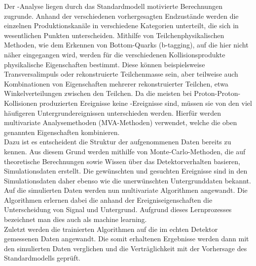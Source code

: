 Der \ttH-Analyse liegen durch das Standardmodell motivierte Berechnungen zugrunde. Anhand der verschiedenen vorhergesagten Endzust\"ande werden die einzelnen Produktionskan\"ale in verschiedene Kategorien unterteilt, die sich in wesentlichen Punkten unterscheiden. Mithilfe von Teilchenphysikalischen Methoden, wie dem Erkennen von Bottom-Quarks (b-tagging), auf die hier nicht n\"aher eingegangen wird, werden f\"ur die verschiedenen Kollisionsprodukte physikalische Eigenschaften bestimmt. Diese k\"onnen beispielsweise Transversalimpuls oder rekonstruierte Teilchenmasse sein, aber teilweise auch Kombinationen von Eigenschaften mehrerer rekonstruierter Teilchen, etwa Winkelverteilungen zwischen den Teilchen. Da die meisten bei Proton-Proton-Kollisionen produzierten Ereignisse keine \ttH-Ereignisse sind, m\"ussen sie von den viel h\"aufigeren Untergrundereignissen unterschieden werden. Hierf\"ur werden multivariate Analysemethoden (MVA-Methoden) verwendet, welche die oben genannten Eigenschaften kombinieren.\\
Dazu ist es entscheident die Struktur der aufgenommenen Daten bereits zu kennen. Aus diesem Grund werden mithilfe von Monte-Carlo-Methoden, die auf theoretische Berechnungen sowie Wissen \"uber das Detektorverhalten basieren, Simulationsdaten erstellt. Die gew\"unschten und gesuchten Ereignisse sind in den Simulationsdaten daher ebenso wie die unerw\"unschten Untergrunddaten bekannt.%
Auf die simulierten Daten werden nun multivariate Algorithmen angewandt. Die Algorithmen erlernen dabei die anhand der Ereigniseigenschaften die Unterscheidung von Signal und Untergrund. Aufgrund dieses Lernprozesses bezeichnet man dies auch als machine learning.\\
Zuletzt werden die trainierten Algorithmen auf die im echten Detektor gemessenen Daten angewandt. Die somit erhaltenen Ergebnisse werden dann mit den simulierten Daten verglichen und die Vertr\"aglichkeit mit der Vorhersage des Standardmodells gepr\"uft.
